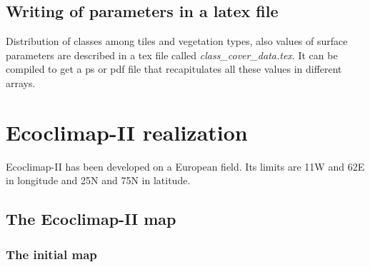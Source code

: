 \section{Writing of parameters in a latex file}

Distribution of classes among tiles and vegetation types, also values of surface parameters are described in a tex file called \textit{class\_cover\_data.tex}. 
It can be compiled to get a ps or pdf file that recapitulates all these values in different arrays. 

\chapter{Ecoclimap-II realization}

Ecoclimap-II has been developed on a European field. Its limits are 11W and 62E in longitude and 25N and 75N in latitude. 

\section{The Ecoclimap-II map}

\subsection{The initial map}\label{init_map}

